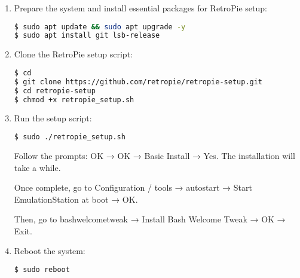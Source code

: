 \begin{enumerate}
\item Prepare the system and install essential packages for RetroPie setup:  
\begin{lstlisting}[language=bash, breaklines=true, breakatwhitespace=true, columns=fullflexible]
$ sudo apt update && sudo apt upgrade -y  
$ sudo apt install git lsb-release
\end{lstlisting}

\item Clone the RetroPie setup script:
\begin{lstlisting}[language=bash, breaklines=true, breakatwhitespace=true, columns=fullflexible]
$ cd
$ git clone https://github.com/retropie/retropie-setup.git
$ cd retropie-setup
$ chmod +x retropie_setup.sh
\end{lstlisting}

\item Run the setup script:
\begin{lstlisting}[language=bash, breaklines=true, breakatwhitespace=true, columns=fullflexible]
$ sudo ./retropie_setup.sh
\end{lstlisting}
Follow the prompts: OK → OK → Basic Install → Yes. The installation will take a while.

Once complete, go to Configuration / tools → autostart → Start EmulationStation at boot → OK.

Then, go to bashwelcometweak → Install Bash Welcome Tweak → OK → Exit.

\item Reboot the system:
\begin{lstlisting}[language=bash, breaklines=true, breakatwhitespace=true, columns=fullflexible]
$ sudo reboot
\end{lstlisting}


\end{enumerate}
